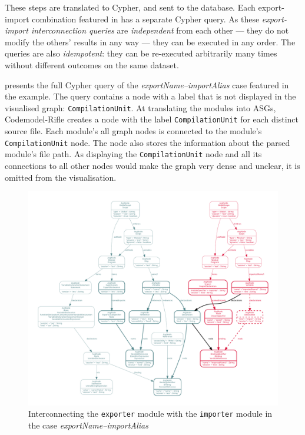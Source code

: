 These steps are translated to Cypher, and sent to the database. Each export-import combination featured in  has a separate Cypher query. As these \emph{export-import interconnection queries} are \emph{independent} from each other — they do not modify the others' results in any way — they can be executed in any order. The queries are also \emph{idempotent}: they can be re-executed arbitrarily many times without different outcomes on the same dataset.

 presents the full Cypher query of the \emph{exportName–importAlias} case featured in the example. The query contains a node with a label that is not displayed in the visualised graph: \lstinline{CompilationUnit}. At translating the modules into ASGs, Codemodel-Rifle creates a node with the label \lstinline{CompilationUnit} for each distinct source file. Each module's all graph nodes is connected to the module's \lstinline{CompilationUnit} node. The node also stores the information about the parsed module's file path. As displaying the \lstinline{CompilationUnit} node and all its connections to all other nodes would make the graph very dense and unclear, it is omitted from the visualisation.

\begin{figure}[!p]
	\centering
	\includegraphics[width=\textwidth, trim=5mm 5mm 5mm 5mm,clip]{figures/export-import-example-asg.pdf}
	\caption{Interconnecting the \lstinline{exporter} module with the \lstinline{importer} module in the case \emph{exportName–importAlias}}
	\label{fig:export-import-example-asg}
\end{figure}

